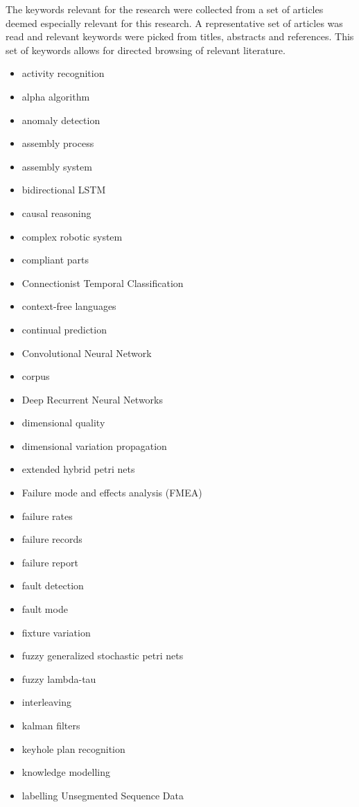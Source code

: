 \documentclass[a4paper,10pt]{article}
\begin{document}
The keywords relevant for the research were collected from a set of articles deemed especially relevant for this research. A representative set of articles was
read and relevant keywords were picked from titles, abstracts and references. This set of keywords allows for directed browsing of relevant literature.

\begin{itemize}
 \item activity recognition
 \item alpha algorithm
 \item anomaly detection
 \item assembly process
 \item assembly system
 \item bidirectional LSTM
 \item causal reasoning
 \item complex robotic system
 \item compliant parts
 \item Connectionist Temporal Classification
 \item context-free languages
 \item continual prediction
 \item Convolutional Neural Network
 \item corpus
 \item Deep Recurrent Neural Networks
 \item dimensional quality
 \item dimensional variation propagation
 \item extended hybrid petri nets
 \item Failure mode and effects analysis (FMEA)
 \item failure rates
 \item failure records
 \item failure report
 \item fault detection
 \item fault mode
 \item fixture variation
 \item fuzzy generalized stochastic petri nets
 \item fuzzy lambda-tau
 \item interleaving
 \item kalman filters
 \item keyhole plan recognition
 \item knowledge modelling
 \item labelling Unsegmented Sequence Data

\end{itemize}
\end{document}
